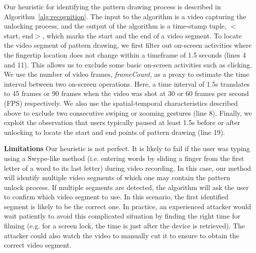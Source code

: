Our heuristic for identifying the pattern drawing process is described
in Algorithm~\ref{alg:recognition}. The input to the algorithm is a video capturing the unlocking process, and the output of the
algorithm is a time-stamp tuple, $<$start, end$>$, which marks the start and the end
of a video segment.
To locate the video segment of pattern drawing, we first filter out on-screen activities where the
fingertip location does not change within a timeframe of 1.5 seconds (lines 4 and 11). This
allows us to exclude some basic on-screen activities such as clicking. We
use the number of video frames, \emph{frameCount}, as a proxy to estimate the time interval between two on-screen operations. Here, a time
interval of 1.5s translates to 45 frames or 90 frames when the video was shot
at 30 or 60 frames per second (FPS) respectively. We also use the
spatial-temporal characteristics described above to exclude two consecutive swiping or zooming gestures (line 8). Finally, we exploit the observation that users
typically paused at least 1.5s before or after unlocking to locate the start
and end points of pattern drawing (line 19).

\noindent \textbf{Limitations} Our heuristic is not perfect. It is likely to fail if the user was typing
using a Swype-like method (i.e. entering words by sliding a finger from
the first letter of a word to its last letter) during video recording. In
this case, our method will identify multiple video segments of which one may contain
the pattern unlock process. If multiple segments are detected, the algorithm will ask the
user to confirm which video segment to use.
In this scenario, the first identified segment is likely to be the correct one.
In practice, an experienced attacker would wait patiently to avoid this
complicated situation by finding the right time for filming (e.g. for a screen
lock, the time is just after the device is retrieved).
The attacker could also watch the video to manually cut it to ensure to obtain the correct video segment.

